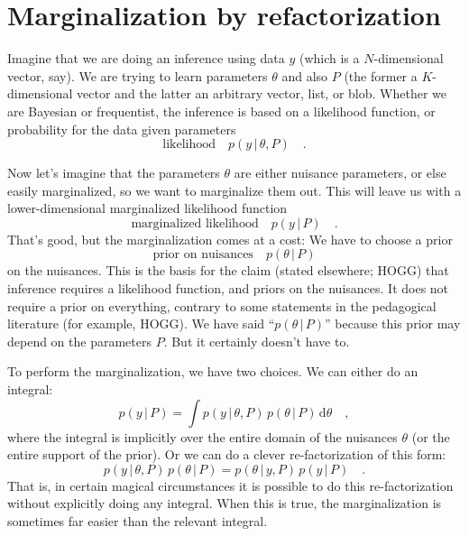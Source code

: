 \documentclass[12pt, letterpaper]{article}
\newcommand{\given}{\,|\,}
\newcommand{\dd}{\mathrm{d}}
\begin{document}
\section{Marginalization by refactorization}

Imagine that we are doing an inference using data $y$ (which is a
$N$-dimensional vector, say).
We are trying to learn parameters $\theta$ and also $P$ (the former a
$K$-dimensional vector and the latter an arbitrary vector, list,
or blob.
Whether we are Bayesian or frequentist, the inference is based on
a likelihood function, or probability for the data given parameters
\begin{equation}
\mbox{likelihood} \quad p(y\given\theta,P)
\quad .
\end{equation}

Now let's imagine that the parameters $\theta$ are either nuisance
parameters, or else easily marginalized, so we want to marginalize
them out.
This will leave us with a lower-dimensional marginalized likelihood
function
\begin{equation}
\mbox{marginalized likelihood} \quad p(y\given P)
\quad .
\end{equation}
That's good, but the marginalization comes at a cost:
We have to choose a prior
\begin{equation}
\mbox{prior on nuisances} \quad p(\theta\given P)
\end{equation}
on the nuisances.
This is the basis for the claim (stated elsewhere; HOGG) that
inference requires a likelihood function, and priors on the nuisances.
It does not require a prior on everything, contrary to some statements
in the pedagogical literature (for example, HOGG).
We have said ``$p(\theta\given P)$'' because this prior may depend on
the parameters $P$. But it certainly doesn't have to.

To perform the marginalization, we have two choices.
We can either do an integral:
\begin{equation}
p(y\given P) = \int p(y\given\theta, P)\,p(\theta\given P)\,\dd\theta
\quad ,
\end{equation}
where the integral is implicitly over the entire domain of the
nuisances $\theta$ (or the entire support of the prior).
Or we can do a clever re-factorization of this form:
\begin{equation}
p(y\given\theta,P)\,p(\theta\given P)
 = p(\theta\given y,P)\,p(y\given P)
\quad .
\end{equation}
That is, in certain magical circumstances it is possible to do this
re-factorization without explicitly doing any integral.
When this is true, the marginalization is sometimes far easier than
the relevant integral.
\end{document}
